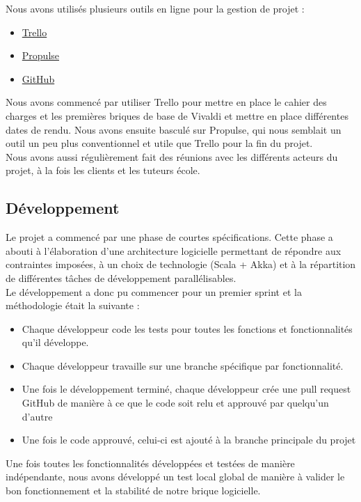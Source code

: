 \documentclass[11pt,a4paper]{article}
\begin{document}
Nous avons utilisés plusieurs outils en ligne pour la gestion de projet :
\begin{itemize}
\item \href{https://www.trello.com}{Trello}
\item \href{http://ppulse.fr}{Propulse}
\item \href{http://www.github.com}{GitHub}
\end{itemize}

Nous avons commencé par utiliser Trello pour mettre en place le cahier des charges et les premières briques de base de Vivaldi et mettre en place différentes dates de rendu. Nous avons ensuite basculé sur Propulse, qui nous semblait un outil un peu plus conventionnel et utile que Trello pour la fin du projet.\\

Nous avons aussi régulièrement fait des réunions avec les différents acteurs du projet, à la fois les clients et les tuteurs école.

\subsection{Développement}
\label{subsec:dev}
Le projet a commencé par une phase de courtes spécifications. Cette phase a abouti à l'élaboration d'une architecture logicielle permettant de répondre aux contraintes imposées, à un choix de technologie (Scala + Akka) et à la répartition de différentes tâches de développement parallélisables. \\

Le développement a donc pu commencer pour un premier sprint et la méthodologie était la suivante :

\begin{itemize}
\item Chaque développeur code les tests pour toutes les fonctions et fonctionnalités qu'il développe.
\item Chaque développeur travaille sur une branche spécifique par fonctionnalité.
\item Une fois le développement terminé, chaque développeur crée une pull request GitHub de manière à ce que le code soit relu et approuvé par quelqu'un d'autre
\item Une fois le code approuvé, celui-ci est ajouté à la branche principale du projet
\end{itemize}

Une fois toutes les fonctionnalités développées et testées de manière indépendante, nous avons développé un test local global de manière à valider le bon fonctionnement et la stabilité de notre brique logicielle.\\
\end{document}

